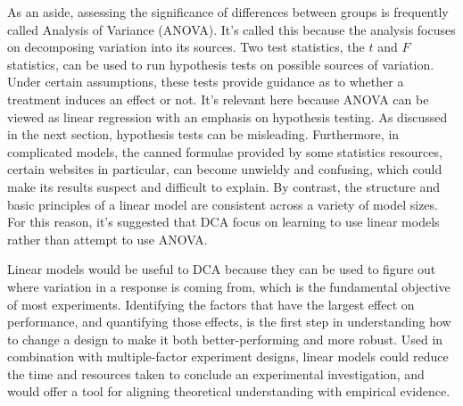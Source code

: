 \documentclass[11pt,a4paper,article]{memoir} %
\begin{document}
As an aside, assessing the significance of differences between groups is frequently called Analysis of Variance (ANOVA). It's called this because the analysis focuses on decomposing variation into its sources. Two test statistics, the $t$ and $F$ statistics, can be used to run hypothesis tests on possible sources of variation. Under certain assumptions, these tests provide guidance as to whether a treatment induces an effect or not. It's relevant here because ANOVA can be viewed as linear regression with an emphasis on hypothesis testing. As discussed in the next section, hypothesis tests can be misleading. Furthermore, in complicated models, the canned formulae provided by some statistics resources, certain websites in particular, can become unwieldy and confusing, which could make its results suspect and difficult to explain. By contrast, the structure and basic principles of a linear model are consistent across a variety of model sizes. For this reason, it's suggested that DCA focus on learning to use linear models rather than attempt to use ANOVA.

Linear models would be useful to DCA because they can be used to figure out where variation in a response is coming from, which is the fundamental objective of most experiments. Identifying the factors that have the largest effect on performance, and quantifying those effects, is the first step in understanding how to change a design to make it both better-performing and more robust. Used in combination with multiple-factor experiment designs, linear models could reduce the time and resources taken to conclude an experimental investigation, and would offer a tool for aligning theoretical understanding with empirical evidence.

\newpage
\end{document}
